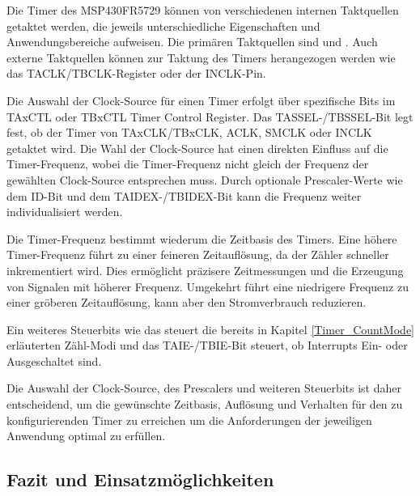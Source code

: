 Die Timer des MSP430FR5729 k\"onnen von verschiedenen internen Taktquellen getaktet werden, die jeweils unterschiedliche Eigenschaften und Anwendungsbereiche aufweisen. Die prim\"aren Taktquellen sind  und . Auch externe Taktquellen k\"onnen zur Taktung des Timers herangezogen werden wie \zB das TACLK/TBCLK-Register oder der INCLK-Pin.  

Die Auswahl der Clock-Source f\"ur einen Timer erfolgt \"uber spezifische Bits im TAxCTL oder TBxCTL Timer Control Register. Das TASSEL-/TBSSEL-Bit legt fest, ob der Timer von TAxCLK/TBxCLK, ACLK, SMCLK oder INCLK getaktet wird. Die Wahl der Clock-Source hat einen direkten Einfluss auf die Timer-Frequenz, wobei die Timer-Frequenz nicht gleich der Frequenz der gew\"ahlten Clock-Source entsprechen muss. Durch optionale Prescaler-Werte wie dem ID-Bit und dem TAIDEX-/TBIDEX-Bit kann die Frequenz weiter individualisiert werden.  

Die Timer-Frequenz bestimmt wiederum die Zeitbasis des Timers. Eine h\"ohere Timer-Frequenz f\"uhrt zu einer feineren Zeitaufl\"osung, da der Z\"ahler schneller inkrementiert wird. Dies erm\"oglicht pr\"azisere Zeitmessungen und die Erzeugung von Signalen mit h\"oherer Frequenz. Umgekehrt f\"uhrt eine niedrigere Frequenz zu einer gr\"oberen Zeitaufl\"osung, kann aber den Stromverbrauch reduzieren.

Ein weiteres Steuerbits wie das  steuert die bereits in Kapitel \ref{Timer_CountMode} erl\"auterten Z\"ahl-Modi und das TAIE-/TBIE-Bit steuert, ob Interrupts Ein- oder Ausgeschaltet sind.

Die Auswahl der Clock-Source, des Prescalers und weiteren Steuerbits ist daher entscheidend, um die gew\"unschte Zeitbasis, Aufl\"osung und Verhalten f\"ur den zu konfigurierenden Timer zu erreichen um die Anforderungen der jeweiligen Anwendung optimal zu erf\"ullen.


\subsection{Fazit und Einsatzmöglichkeiten}
\label{TimerEinsatzmöglichkeiten}

